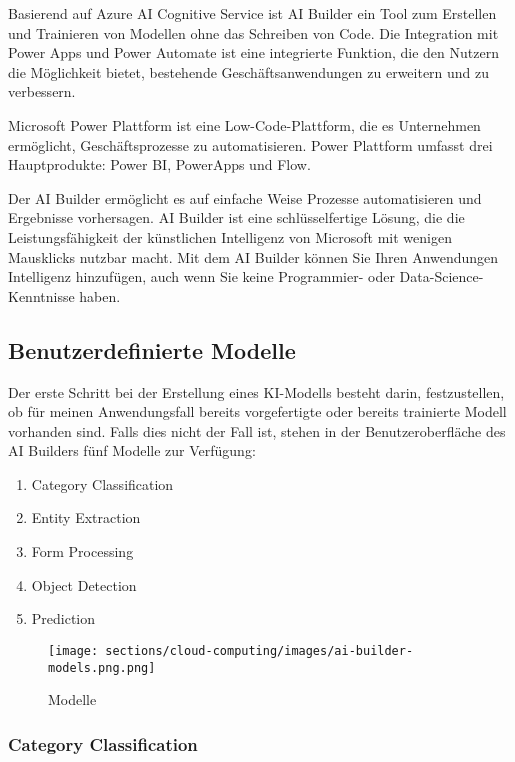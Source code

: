 Basierend auf Azure AI Cognitive Service ist AI Builder ein Tool zum Erstellen und Trainieren von Modellen ohne das Schreiben von Code. Die Integration mit Power Apps und Power Automate ist eine integrierte Funktion, die den Nutzern die Möglichkeit bietet, bestehende Geschäftsanwendungen zu erweitern und zu verbessern.

Microsoft Power Plattform ist eine Low-Code-Plattform, die es Unternehmen ermöglicht, Geschäftsprozesse zu automatisieren. Power Plattform umfasst drei Hauptprodukte: Power BI, PowerApps und Flow.

Der AI Builder ermöglicht es auf einfache Weise Prozesse automatisieren und Ergebnisse vorhersagen. AI Builder ist eine schlüsselfertige Lösung, die die Leistungsfähigkeit der künstlichen Intelligenz von Microsoft mit wenigen Mausklicks nutzbar macht. Mit dem AI Builder können Sie Ihren Anwendungen Intelligenz hinzufügen, auch wenn Sie keine Programmier- oder Data-Science-Kenntnisse haben.

\subsection{Benutzerdefinierte Modelle}

Der erste Schritt bei der Erstellung eines KI-Modells besteht darin, festzustellen, ob für meinen Anwendungsfall bereits vorgefertigte oder bereits trainierte Modell vorhanden sind. Falls dies nicht der Fall ist, stehen in der Benutzeroberfläche des AI Builders fünf Modelle zur Verfügung:

\begin{enumerate}
    \item Category Classification
    \item Entity Extraction
    \item Form Processing
    \item Object Detection
    \item Prediction
\end{enumerate}

\begin{figure}[h]
    \centering
    \texttt{[image: sections/cloud-computing/images/ai-builder-models.png.png]}
    \caption{Modelle}
    \label{fig:kimldl-comparison}
\end{figure}

\subsubsection{Category Classification}

